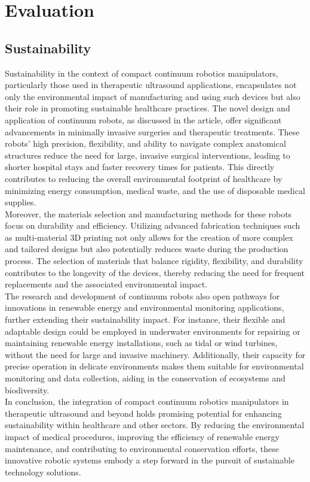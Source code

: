 \section{Evaluation}
\subsection{Sustainability}
Sustainability in the context of compact continuum robotics manipulators, particularly those used in therapeutic 
ultrasound applications, encapsulates not only the environmental impact of manufacturing and using such devices 
but also their role in promoting sustainable healthcare practices. The novel design and application of continuum 
robots, as discussed in the article, offer significant advancements in minimally invasive surgeries and therapeutic 
treatments. These robots' high precision, flexibility, and ability to navigate complex anatomical structures reduce 
the need for large, invasive surgical interventions, leading to shorter hospital stays and faster recovery times for 
patients. This directly contributes to reducing the overall environmental footprint of healthcare by minimizing energy 
consumption, medical waste, and the use of disposable medical supplies. \\
Moreover, the materials selection and manufacturing methods for these robots focus on durability and efficiency. Utilizing 
advanced fabrication techniques such as multi-material 3D printing not only allows for the creation of more complex and 
tailored designs but also potentially reduces waste during the production process. The selection of materials that balance 
rigidity, flexibility, and durability contributes to the longevity of the devices, thereby reducing the need for frequent 
replacements and the associated environmental impact. \\
The research and development of continuum robots also open pathways for innovations in renewable energy and environmental 
monitoring applications, further extending their sustainability impact. For instance, their flexible and adaptable design 
could be employed in underwater environments for repairing or maintaining renewable energy installations, such as tidal 
or wind turbines, without the need for large and invasive machinery. Additionally, their capacity for precise operation 
in delicate environments makes them suitable for environmental monitoring and data collection, aiding in the conservation 
of ecosystems and biodiversity. \\
In conclusion, the integration of compact continuum robotics manipulators in therapeutic ultrasound and beyond holds 
promising potential for enhancing sustainability within healthcare and other sectors. By reducing the environmental 
impact of medical procedures, improving the efficiency of renewable energy maintenance, and contributing to environmental 
conservation efforts, these innovative robotic systems embody a step forward in the pursuit of sustainable technology solutions. 








\newpage